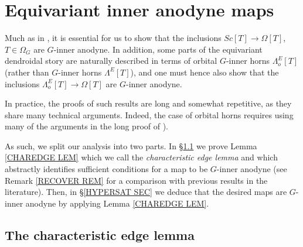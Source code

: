 \documentclass[a4paper,10pt
,draft
]{article}%
\begin{document}
\section{Equivariant inner anodyne maps}\label{EQINNERAN SEC}


Much as in \cite[\S 2]{CM13a}, 
it is essential for us to show that the inclusions $Sc[T] \to \Omega[T]$, $T\in \Omega_G$ are $G$-inner anodyne.
In addition, some parts of the equivariant dendroidal story are 
naturally described in terms of 
orbital $G$-inner horns $\Lambda^E_o[T]$ 
(rather than $G$-inner horns $\Lambda^E[T]$),
and one must hence also show that the inclusions
$\Lambda^E_o[T] \to \Omega[T]$
are $G$-inner anodyne.

In practice, the proofs of such results are long and somewhat repetitive, as they share many technical arguments.
Indeed, the case of orbital horns requires using many of the arguments in the long proof of \cite[Thm 7.1]{Per17}).

As such, we split our analysis into two parts.
In \S \ref{CHAREDGE SEC} we prove Lemma \ref{CHAREDGE LEM} which  we call the \textit{characteristic edge lemma} and
which abstractly identifies sufficient conditions for a map to be $G$-inner anodyne
(see Remark \ref{RECOVER REM} for a comparison with previous results in the literature).
Then, in \S \ref{HYPERSAT SEC} we deduce that the desired maps
are $G$-inner anodyne by applying Lemma \ref{CHAREDGE LEM}.



\subsection{The characteristic edge lemma} \label{CHAREDGE SEC}
\end{document}
